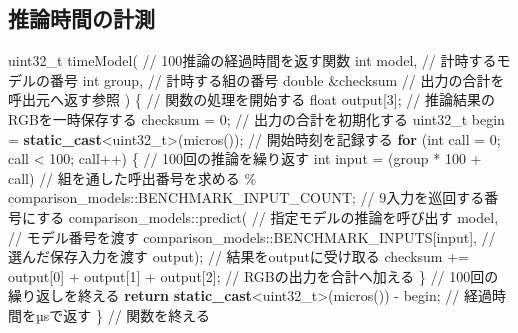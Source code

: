 \documentclass[
  10pt,
  a4paper,
]{article}
\newenvironment{Shaded}{}{}
\newcommand{\CommentTok}[1]{\textcolor[rgb]{0.38,0.63,0.69}{\textit{#1}}}
\newcommand{\ControlFlowTok}[1]{\textcolor[rgb]{0.00,0.44,0.13}{\textbf{#1}}}
\newcommand{\DataTypeTok}[1]{\textcolor[rgb]{0.56,0.13,0.00}{#1}}
\newcommand{\DecValTok}[1]{\textcolor[rgb]{0.25,0.63,0.44}{#1}}
\newcommand{\KeywordTok}[1]{\textcolor[rgb]{0.00,0.44,0.13}{\textbf{#1}}}
\newcommand{\NormalTok}[1]{#1}
\newcommand{\OperatorTok}[1]{\textcolor[rgb]{0.40,0.40,0.40}{#1}}
\renewcommand{\CommentTok}[1]{\textcolor[rgb]{0.25,0.25,0.25}{#1}}
\begin{document}

\subsection{推論時間の計測}\label{ux63a8ux8ad6ux6642ux9593ux306eux8a08ux6e2c}

\begin{Shaded}
\begin{Highlighting}[]
\DataTypeTok{uint32\_t}\NormalTok{ timeModel}\OperatorTok{(} \CommentTok{// 100推論の経過時間を返す関数}
  \DataTypeTok{int}\NormalTok{ model}\OperatorTok{,} \CommentTok{// 計時するモデルの番号}
  \DataTypeTok{int}\NormalTok{ group}\OperatorTok{,} \CommentTok{// 計時する組の番号}
  \DataTypeTok{double} \OperatorTok{\&}\NormalTok{checksum }\CommentTok{// 出力の合計を呼出元へ返す参照}
\OperatorTok{)} \OperatorTok{\{} \CommentTok{// 関数の処理を開始する}
  \DataTypeTok{float}\NormalTok{ output}\OperatorTok{[}\DecValTok{3}\OperatorTok{];} \CommentTok{// 推論結果のRGBを一時保存する}
\NormalTok{  checksum }\OperatorTok{=} \DecValTok{0}\OperatorTok{;} \CommentTok{// 出力の合計を初期化する}
  \DataTypeTok{uint32\_t}\NormalTok{ begin }\OperatorTok{=} \KeywordTok{static\_cast}\OperatorTok{\textless{}}\DataTypeTok{uint32\_t}\OperatorTok{\textgreater{}(}\NormalTok{micros}\OperatorTok{());} \CommentTok{// 開始時刻を記録する}
  \ControlFlowTok{for} \OperatorTok{(}\DataTypeTok{int}\NormalTok{ call }\OperatorTok{=} \DecValTok{0}\OperatorTok{;}\NormalTok{ call }\OperatorTok{\textless{}} \DecValTok{100}\OperatorTok{;}\NormalTok{ call}\OperatorTok{++)} \OperatorTok{\{} \CommentTok{// 100回の推論を繰り返す}
    \DataTypeTok{int}\NormalTok{ input }\OperatorTok{=} \OperatorTok{(}\NormalTok{group }\OperatorTok{*} \DecValTok{100} \OperatorTok{+}\NormalTok{ call}\OperatorTok{)} \CommentTok{// 組を通した呼出番号を求める}
      \OperatorTok{\%}\NormalTok{ comparison\_models}\OperatorTok{::}\NormalTok{BENCHMARK\_INPUT\_COUNT}\OperatorTok{;} \CommentTok{// 9入力を巡回する番号にする}
\NormalTok{    comparison\_models}\OperatorTok{::}\NormalTok{predict}\OperatorTok{(} \CommentTok{// 指定モデルの推論を呼び出す}
\NormalTok{      model}\OperatorTok{,} \CommentTok{// モデル番号を渡す}
\NormalTok{      comparison\_models}\OperatorTok{::}\NormalTok{BENCHMARK\_INPUTS}\OperatorTok{[}\NormalTok{input}\OperatorTok{],} \CommentTok{// 選んだ保存入力を渡す}
\NormalTok{      output}\OperatorTok{);} \CommentTok{// 結果をoutputに受け取る}
\NormalTok{    checksum }\OperatorTok{+=}\NormalTok{ output}\OperatorTok{[}\DecValTok{0}\OperatorTok{]} \OperatorTok{+}\NormalTok{ output}\OperatorTok{[}\DecValTok{1}\OperatorTok{]} \OperatorTok{+}\NormalTok{ output}\OperatorTok{[}\DecValTok{2}\OperatorTok{];} \CommentTok{// RGBの出力を合計へ加える}
  \OperatorTok{\}} \CommentTok{// 100回の繰り返しを終える}
  \ControlFlowTok{return} \KeywordTok{static\_cast}\OperatorTok{\textless{}}\DataTypeTok{uint32\_t}\OperatorTok{\textgreater{}(}\NormalTok{micros}\OperatorTok{())} \OperatorTok{{-}}\NormalTok{ begin}\OperatorTok{;} \CommentTok{// 経過時間をµsで返す}
\OperatorTok{\}} \CommentTok{// 関数を終える}
\end{Highlighting}
\end{Shaded}
\end{document}
